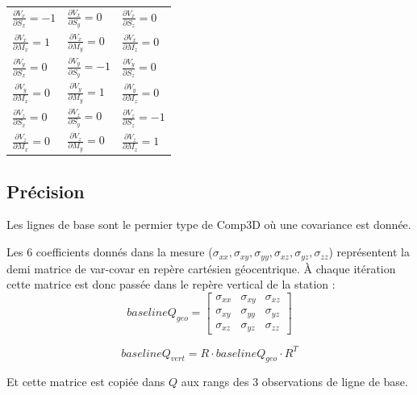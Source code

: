 \documentclass[french]{report}
\begin{document}
\vspace{0.3cm}
\begin{tabular}{lll}
$\frac{\partial{V_x}}{\partial{S_x}} = -1$ & $\frac{\partial{V_x}}{\partial{S_y}} = 0$ & $\frac{\partial{V_x}}{\partial{S_z}} = 0$ \\[0.3cm]
$\frac{\partial{V_x}}{\partial{M_x}} = 1$ & $\frac{\partial{V_x}}{\partial{M_y}} = 0$ & $\frac{\partial{V_x}}{\partial{M_z}} = 0$ \\[0.3cm]
$\frac{\partial{V_y}}{\partial{S_x}} = 0$ & $\frac{\partial{V_y}}{\partial{S_y}} = -1$ & $\frac{\partial{V_y}}{\partial{S_z}} = 0$ \\[0.3cm]
$\frac{\partial{V_y}}{\partial{M_x}} = 0$ & $\frac{\partial{V_y}}{\partial{M_y}} = 1$ & $\frac{\partial{V_y}}{\partial{M_z}} = 0$ \\[0.3cm]

$\frac{\partial{V_z}}{\partial{S_x}} = 0$ & $\frac{\partial{V_z}}{\partial{S_y}} = 0$ & $\frac{\partial{V_z}}{\partial{S_z}} = -1$ \\[0.3cm]
$\frac{\partial{V_z}}{\partial{M_x}} = 0$ & $\frac{\partial{V_z}}{\partial{M_y}} = 0$ & $\frac{\partial{V_z}}{\partial{M_z}} = 1$ \\[0.3cm]
\end{tabular}


\subsection{Précision}
Les lignes de base sont le permier type de Comp3D où une covariance est donnée.

Les 6 coefficients donnés dans la mesure ($\sigma_{xx}, \sigma_{xy}, \sigma_{yy}, \sigma_{xz}, \sigma_{yz}, \sigma_{zz}$) représentent la demi matrice de var-covar
en repère cartésien géocentrique.
À chaque itération cette matrice est donc passée dans le repère vertical de la station :
$$ baselineQ_{geo} =
\begin{bmatrix}
\sigma_{xx}& \sigma_{xy}& \sigma_{xz}\\
\sigma_{xy}& \sigma_{yy}& \sigma_{yz}\\
\sigma_{xz}& \sigma_{yz}& \sigma_{zz}
\end{bmatrix}$$

$$ baselineQ_{vert} = R  \cdot baselineQ_{geo} \cdot R^T $$

Et cette matrice est copiée dans $Q$ aux rangs des 3 observations de ligne de base.

\end{document}
